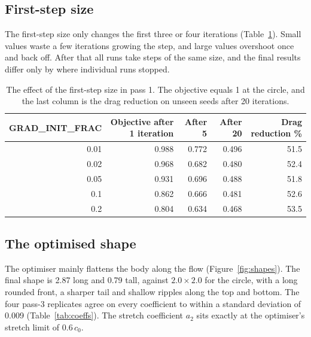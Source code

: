 \documentclass[10pt]{article}
\begin{document}
\subsection{First-step size}
The first-step size only changes the first three or four iterations (Table~\ref{tab:frac}).
Small values waste a few iterations growing the step, and large values overshoot once and back off.
After that all runs take steps of the same size, and the final results differ only by where individual runs stopped.

\begin{table}[H]
\centering
\small
\caption{\label{tab:frac}The effect of the first-step size in pass 1. The objective equals 1 at the circle, and the last column is the drag reduction on unseen seeds after 20 iterations.}
\begin{tabular}{rrrrr}
\toprule
GRAD\_INIT\_FRAC & Objective after 1 iteration & After 5 & After 20 & Drag reduction \% \\
\midrule
0.01 & 0.988 & 0.772 & 0.496 & 51.5 \\
0.02 & 0.968 & 0.682 & 0.480 & 52.4 \\
0.05 & 0.931 & 0.696 & 0.488 & 51.8 \\
0.1 & 0.862 & 0.666 & 0.481 & 52.6 \\
0.2 & 0.804 & 0.634 & 0.468 & 53.5 \\
\bottomrule
\end{tabular}
\par{}
\end{table}


\subsection{The optimised shape}
The optimiser mainly flattens the body along the flow (Figure~\ref{fig:shapes}).
The final shape is 2.87 long and 0.79 tall, against $2.0 \times 2.0$ for the circle, with a long rounded front, a sharper tail and shallow ripples along the top and bottom.
The four pass-3 replicates agree on every coefficient to within a standard deviation of 0.009 (Table~\ref{tab:coeffs}).
The stretch coefficient $a_2$ sits exactly at the optimiser's stretch limit of $0.6\,c_0$.
\end{document}
